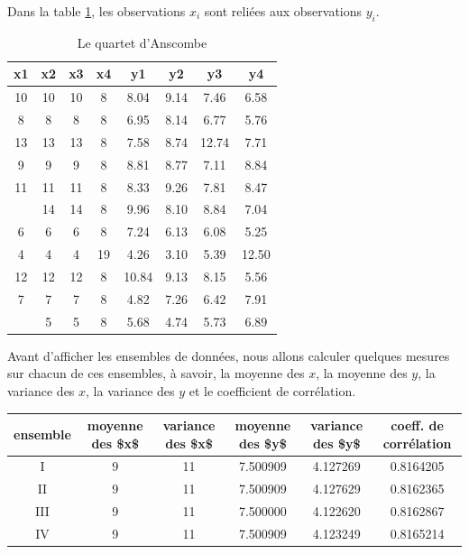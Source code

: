 \documentclass[]{book}
\theoremstyle{definition}
\theoremstyle{definition}
\theoremstyle{definition}
\theoremstyle{remark}
\begin{document}
Dans la table \ref{tab:quartet-anscombe}, les observations \(x_i\) sont
reliées aux observations \(y_i\).

\begin{table}[t]

\caption{\label{tab:quartet-anscombe}Le quartet d'Anscombe}
\centering
\begin{tabular}{cccccccc}
\toprule
x1 & x2 & x3 & x4 & y1 & y2 & y3 & y4\\
\midrule
10 & 10 & 10 & 8 & 8.04 & 9.14 & 7.46 & 6.58\\
8 & 8 & 8 & 8 & 6.95 & 8.14 & 6.77 & 5.76\\
13 & 13 & 13 & 8 & 7.58 & 8.74 & 12.74 & 7.71\\
9 & 9 & 9 & 8 & 8.81 & 8.77 & 7.11 & 8.84\\
11 & 11 & 11 & 8 & 8.33 & 9.26 & 7.81 & 8.47\\
\addlinespace
14 & 14 & 14 & 8 & 9.96 & 8.10 & 8.84 & 7.04\\
6 & 6 & 6 & 8 & 7.24 & 6.13 & 6.08 & 5.25\\
4 & 4 & 4 & 19 & 4.26 & 3.10 & 5.39 & 12.50\\
12 & 12 & 12 & 8 & 10.84 & 9.13 & 8.15 & 5.56\\
7 & 7 & 7 & 8 & 4.82 & 7.26 & 6.42 & 7.91\\
\addlinespace
5 & 5 & 5 & 8 & 5.68 & 4.74 & 5.73 & 6.89\\
\bottomrule
\end{tabular}
\end{table}

Avant d'afficher les ensembles de données, nous allons calculer quelques
mesures sur chacun de ces ensembles, à savoir, la moyenne des \(x\), la
moyenne des \(y\), la variance des \(x\), la variance des \(y\) et le
coefficient de corrélation.

\begin{tabular}{c|c|c|c|c|c}
\hline
ensemble & moyenne des \$x\$ & variance des \$x\$ & moyenne des \$y\$ & variance des \$y\$ & coeff. de corrélation\\
\hline
I & 9 & 11 & 7.500909 & 4.127269 & 0.8164205\\
\hline
II & 9 & 11 & 7.500909 & 4.127629 & 0.8162365\\
\hline
III & 9 & 11 & 7.500000 & 4.122620 & 0.8162867\\
\hline
IV & 9 & 11 & 7.500909 & 4.123249 & 0.8165214\\
\hline
\end{tabular}
\end{document}
